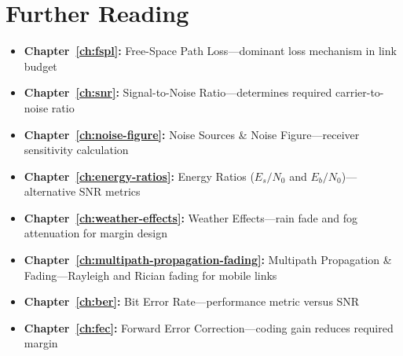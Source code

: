 \section{Further Reading}

\begin{itemize}
\item \textbf{Chapter~\ref{ch:fspl}:} Free-Space Path Loss---dominant loss mechanism in link budget
\item \textbf{Chapter~\ref{ch:snr}:} Signal-to-Noise Ratio---determines required carrier-to-noise ratio
\item \textbf{Chapter~\ref{ch:noise-figure}:} Noise Sources \& Noise Figure---receiver sensitivity calculation
\item \textbf{Chapter~\ref{ch:energy-ratios}:} Energy Ratios ($E_s/N_0$ and $E_b/N_0$)---alternative SNR metrics
\item \textbf{Chapter~\ref{ch:weather-effects}:} Weather Effects---rain fade and fog attenuation for margin design
\item \textbf{Chapter~\ref{ch:multipath-propagation-fading}:} Multipath Propagation \& Fading---Rayleigh and Rician fading for mobile links
\item \textbf{Chapter~\ref{ch:ber}:} Bit Error Rate---performance metric versus SNR
\item \textbf{Chapter~\ref{ch:fec}:} Forward Error Correction---coding gain reduces required margin
\end{itemize}
